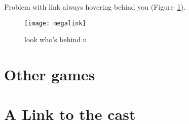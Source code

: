 \documentclass[twocolumn]{article}
\begin{document}
Problem with link always hovering behind you (Figure~\ref{fig:megalink}).
\begin{figure}[ht]
\begin{center}
\texttt{[image: megalink]}
\end{center}\vspace{-0.1in}
\caption{look who's behind u
} \label{fig:megalink}
\end{figure}


\section{Other games}

\section{A Link to the cast} \label{sec:cast}

\nocite{murphy2013first}



\end{document}
